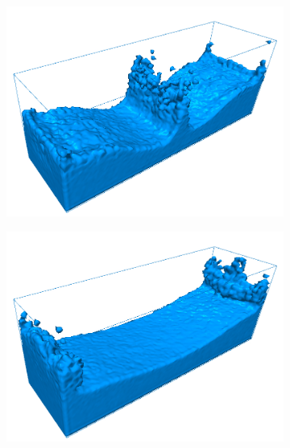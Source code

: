 \begin{figure}[h!]
\begin{subfigure}[t]{.3\textwidth}
        	\includegraphics[scale=0.65]{obrazky-figures/app/Blocks03.jpg}
	\end{subfigure}%
		\begin{subfigure}[t]{.3\textwidth}
			\centering
        	\includegraphics[scale=0.65]{obrazky-figures/app/Blocks04.jpg}
	\end{subfigure}%
		\begin{subfigure}[t]{.3\textwidth}
			\centering

\end{subfigure}
\end{figure}
